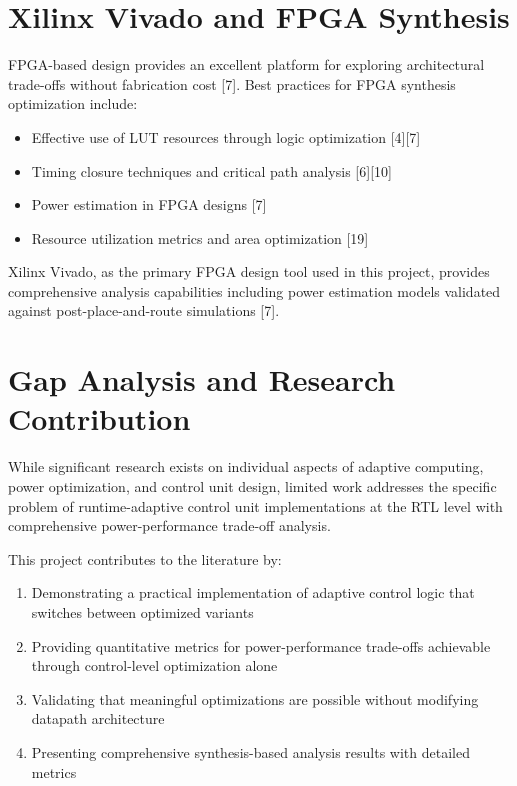 \documentclass[15pt,a4paper]{report}
\begin{document}
\section{Xilinx Vivado and FPGA Synthesis}

FPGA-based design provides an excellent platform for exploring architectural trade-offs without fabrication cost [7]. Best practices for FPGA synthesis optimization include:

\begin{itemize}
    \item Effective use of LUT resources through logic optimization [4][7]
    \item Timing closure techniques and critical path analysis [6][10]
    \item Power estimation in FPGA designs [7]
    \item Resource utilization metrics and area optimization [19]
\end{itemize}

Xilinx Vivado, as the primary FPGA design tool used in this project, provides comprehensive analysis capabilities including power estimation models validated against post-place-and-route simulations [7].

\section{Gap Analysis and Research Contribution}

While significant research exists on individual aspects of adaptive computing, power optimization, and control unit design, limited work addresses the specific problem of runtime-adaptive control unit implementations at the RTL level with comprehensive power-performance trade-off analysis.

This project contributes to the literature by:

\begin{enumerate}
    \item Demonstrating a practical implementation of adaptive control logic that switches between optimized variants
    \item Providing quantitative metrics for power-performance trade-offs achievable through control-level optimization alone
    \item Validating that meaningful optimizations are possible without modifying datapath architecture
    \item Presenting comprehensive synthesis-based analysis results with detailed metrics
\end{enumerate}
\end{document}
